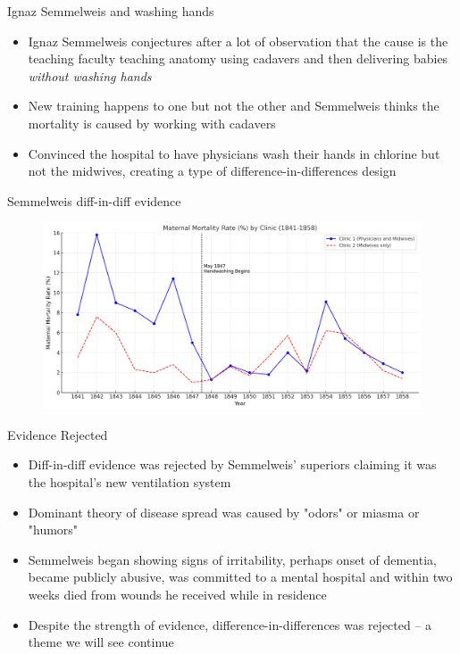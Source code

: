 \documentclass{beamer}
\begin{document}
\begin{frame}{Ignaz Semmelweis and washing hands}

\begin{itemize}
\item Ignaz Semmelweis conjectures after a lot of observation that the cause is the teaching faculty teaching anatomy using cadavers and then delivering babies \emph{without washing hands}
\item New training happens to one but not the other and Semmelweis thinks the mortality is caused by working with cadavers
\item Convinced the hospital to have physicians wash their hands in chlorine but not the midwives, creating a type of difference-in-differences design 
\end{itemize}

\end{frame}

\begin{frame}{Semmelweis diff-in-diff evidence}

	\begin{figure}
	\includegraphics[scale=0.5]{./lecture_includes/semmelweis_graphic.png}
	\end{figure}


\end{frame}

\begin{frame}{Evidence Rejected}

\begin{itemize}

\item Diff-in-diff evidence was rejected by Semmelweis' superiors claiming it was the hospital's new ventilation system
\item Dominant theory of disease spread was caused by "odors" or miasma or "humors"
\item Semmelweis began showing signs of irritability, perhaps onset of dementia, became publicly abusive, was committed to a mental hospital and within two weeks died from wounds he received while in residence
\item Despite the strength of evidence, difference-in-differences was rejected -- a theme we will see continue

\end{itemize}

\end{frame}
\end{document}
